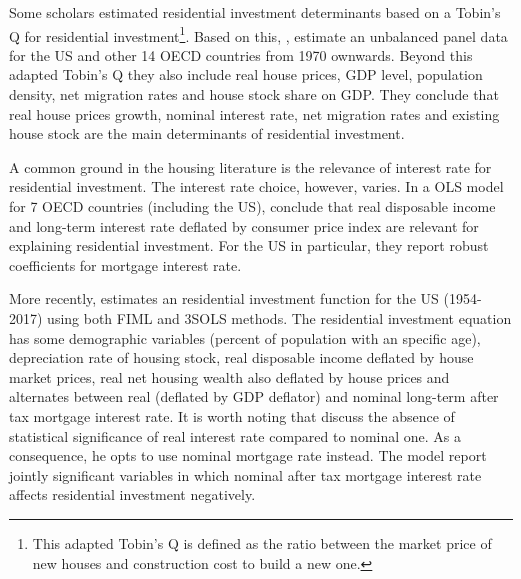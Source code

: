 \documentclass[12pt, a4paper]{article}
\begin{document}
Some scholars estimated residential investment determinants based on a Tobin's Q for residential investment\footnote{This adapted Tobin's Q is defined as the ratio between the market price of new houses and construction cost to build a new one.}.
Based on this, \textcite{kohlscheen_2018_Residential}, estimate an unbalanced panel data for the US and other 14 OECD countries from 1970 ownwards.
Beyond this adapted Tobin's Q they also include real house prices, GDP level, population density, net migration rates and house stock share on GDP.
They conclude that real house prices growth, nominal interest rate, net migration rates and existing house stock are the main determinants of residential investment.

A common ground in the housing literature is the relevance of interest rate for residential investment.
The interest rate choice, however, varies.
In a OLS model for 7 OECD countries (including the US), \textcite{egebo_1990_MODEL} conclude that real disposable income and long-term interest rate deflated by consumer price index are relevant for explaining residential investment.
For the US in particular, they report robust coefficients  for mortgage interest rate.

More recently, \textcite{fair_macroeconometric_2018} estimates an residential investment function for the US (1954-2017) using both FIML and 3SOLS methods.
The residential investment equation has some demographic variables (percent of population with an specific age), depreciation rate of housing stock, real disposable income deflated by house market prices, real net housing wealth also deflated by house prices and alternates between real (deflated by GDP deflator) and nominal long-term after tax mortgage interest rate.
It is worth noting that \textcite{fair_macroeconometric_2018} discuss the absence of statistical significance of real interest rate compared to nominal one.
As a consequence, he opts to use nominal mortgage rate instead.
The model report jointly significant variables in which nominal after tax mortgage interest rate affects residential investment negatively.
\end{document}
